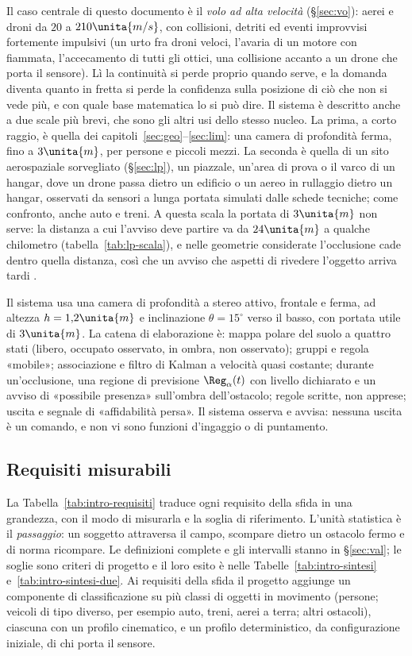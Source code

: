 Il caso centrale di questo documento è il \emph{volo ad alta velocità} (\S\ref{sec:vo}): aerei e droni da $20$ a $210\unita{m/s}$, con collisioni, detriti ed eventi improvvisi fortemente impulsivi (un urto fra droni veloci, l'avaria di un motore con fiammata, l'accecamento di tutti gli ottici, una collisione accanto a un drone che porta il sensore). Lì la continuità si perde proprio quando serve, e la domanda diventa quanto in fretta si perde la confidenza sulla posizione di ciò che non si vede più, e con quale base matematica lo si può dire. Il sistema è descritto anche a due scale più brevi, che sono gli altri usi dello stesso nucleo. La prima, a corto raggio, è quella dei capitoli~\ref{sec:geo}--\ref{sec:lim}: una camera di profondità ferma, fino a $3\unita{m}$, per persone e piccoli mezzi. La seconda è quella di un sito aerospaziale sorvegliato (\S\ref{sec:lp}), un piazzale, un'area di prova o il varco di un hangar, dove un drone passa dietro un edificio o un aereo in rullaggio dietro un hangar, osservati da sensori a lunga portata simulati dalle schede tecniche; come confronto, anche auto e treni. A questa scala la portata di $3\unita{m}$ non serve: la distanza a cui l'avviso deve partire va da $24\unita{m}$ a qualche chilometro (tabella~\ref{tab:lp-scala}), e nelle geometrie considerate l'occlusione cade dentro quella distanza, così che un avviso che aspetti di rivedere l'oggetto arriva tardi .

Il sistema usa una camera di profondità a stereo attivo, frontale e ferma, ad altezza $h=1{,}2\unita{m}$ e inclinazione $\theta=15^\circ$ verso il basso, con portata utile di $3\unita{m}$. La catena di elaborazione è: mappa polare del suolo a quattro stati (libero, occupato osservato, in ombra, non osservato); gruppi e regola «mobile»; associazione e filtro di Kalman \cite{kalman1960} a velocità quasi costante; durante un'occlusione, una regione di previsione $\Reg_\alpha(t)$ con livello dichiarato e un avviso di «possibile presenza» sull'ombra dell'ostacolo; regole scritte, non apprese; uscita e segnale di «affidabilità persa». Il sistema osserva e avvisa: nessuna uscita è un comando, e non vi sono funzioni d'ingaggio o di puntamento.

\subsection{Requisiti misurabili}\label{sec:intro-requisiti}

La Tabella~\ref{tab:intro-requisiti} traduce ogni requisito della sfida in una grandezza, con il modo di misurarla e la soglia di riferimento. L'unità statistica è il \emph{passaggio}: un soggetto attraversa il campo, scompare dietro un ostacolo fermo e di norma ricompare. Le definizioni complete e gli intervalli stanno in \S\ref{sec:val}; le soglie sono criteri di progetto e il loro esito è nelle Tabelle~\ref{tab:intro-sintesi} e~\ref{tab:intro-sintesi-due}. Ai requisiti della sfida il progetto aggiunge un componente di classificazione su più classi di oggetti in movimento (persone; veicoli di tipo diverso, per esempio auto, treni, aerei a terra; altri ostacoli), ciascuna con un profilo cinematico, e un profilo deterministico, da configurazione iniziale, di chi porta il sensore.

